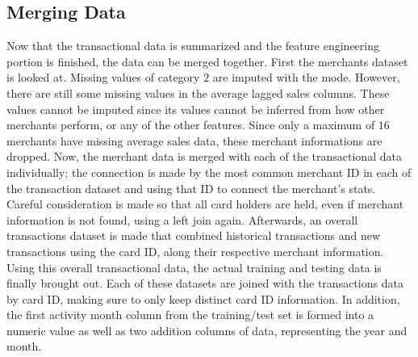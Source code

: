 \documentclass[journal, a4paper]{IEEEtran}
\begin{document}
\subsection{Merging Data}
Now that the transactional data is summarized and the feature engineering portion is finished, the data can be merged together. First the merchants dataset is looked at. Missing values of category $2$ are imputed with the mode. However, there are still some missing values in the average lagged sales columns. These values cannot be imputed since its values cannot be inferred from how other merchants perform, or any of the other features. Since only a maximum of $16$ merchants have missing average sales data, these merchant informations are dropped. Now, the merchant data is merged with each of the transactional data individually; the connection is made by the most common merchant ID in each of the transaction dataset and using that ID to connect the merchant's stats. Careful consideration is made so that all card holders are held, even if merchant information is not found, using a left join again. Afterwards, an overall transactions dataset is made that combined historical transactions and new transactions using the card ID, along their respective merchant information. Using this overall transactional data, the actual training and testing data is finally brought out. Each of these datasets are joined with the transactions data by card ID, making sure to only keep distinct card ID information. In addition, the first activity month column from the training/test set is formed into a numeric value as well as two addition columns of data, representing the year and month. 
\end{document}
